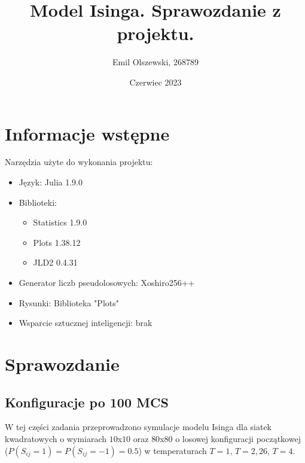 \documentclass[12pt]{article}
\title{Model Isinga. Sprawozdanie z projektu.}
\author{Emil Olszewski, 268789}
\date{Czerwiec 2023}
\begin{document}
\maketitle

\section{Informacje wstępne}


Narzędzia użyte do wykonania projektu:


\begin{itemize}
\item Język: Julia 1.9.0
\item Biblioteki: 
\begin{itemize}
\item Statistics 1.9.0
\item Plots 1.38.12
\item JLD2 0.4.31
\end{itemize}
\item Generator liczb pseudolosowych: Xoshiro256++
\item Rysunki: Biblioteka "Plots"
\item Wsparcie sztucznej inteligencji: brak
\end{itemize}



\section{Sprawozdanie}

\subsection{Konfiguracje po 100 MCS}

W tej części zadania przeprowadzono symulacje modelu Isinga dla siatek kwadratowych o wymiarach $10$x$10$ oraz $80$x$80$ o losowej konfiguracji początkowej ($P(S_{ij} = 1) = P(S_{ij} = -1) = 0.5$) w temperaturach $T=1,\,T=2,26,\,T=4$.
\newpage
 
\end{document}
